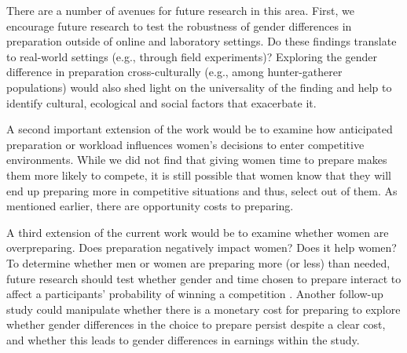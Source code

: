 \documentclass[letterpaper, nobind]{templates/ociamthesis}
\begin{document}
There are a number of avenues for future research in this area. First, we encourage future research to test the robustness of gender differences in preparation outside of online and laboratory settings. Do these findings translate to real-world settings (e.g., through field experiments)? Exploring the gender difference in preparation cross-culturally (e.g., among hunter-gatherer populations) \autocite{Apicella2014a,Apicella2012,Apicella2017,Apicella2015,Apicella2009,Apicella2015a,Apicella2018,Apicella2007,Apicella2014,Apicella2016,Apicella2018a,Apicella2007a} would also shed light on the universality of the finding and help to identify cultural, ecological and social factors that exacerbate it.

A second important extension of the work would be to examine how anticipated preparation or workload influences women's decisions to enter competitive environments. While we did not find that giving women time to prepare makes them more likely to compete, it is still possible that women know that they will end up preparing more in competitive situations and thus, select out of them. As mentioned earlier, there are opportunity costs to preparing.

A third extension of the current work would be to examine whether women are overpreparing. Does preparation negatively impact women? Does it help women? To determine whether men or women are preparing more (or less) than needed, future research should test whether gender and time chosen to prepare interact to affect a participants' probability of winning a competition \autocite[see][]{Niederle2007}. Another follow-up study could manipulate whether there is a monetary cost for preparing to explore whether gender differences in the choice to prepare persist despite a clear cost, and whether this leads to gender differences in earnings within the study.
\end{document}
